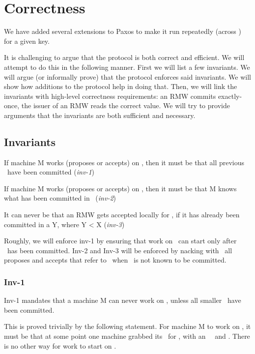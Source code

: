 \section{Correctness}\label{sec:cor}
We have added several extensions to Paxos to make it run repeatedly (\ie across \lognos) for a given key.

It is challenging to argue that the protocol is both  correct and  efficient.
We will attempt to do this in the following manner. 
First we will list a few invariants. We will argue (or informally prove) that the protocol  enforces said invariants. We will show how additions to the protocol help in doing that.
Then, we will link the invariants with high-level correctness requirements: an RMW commits exactly-once, the issuer of an RMW reads the correct value. We will try to provide arguments that the invariants are both sufficient and necessary.

\subsection{Invariants} \label{sec:cor:invs}

\squishlist
\item If machine M works (proposes or accepts) on \lognox, then it must be that all previous \lognos~have been committed (\emph{inv-1})
\item If machine M works (proposes or accepts) on \lognox, then it must be that M knows what has been committed in \lognoxmin~(\emph{inv-2})
\item It can never be that an RMW gets accepted locally for \lognox, if it has already been committed in a \lognoeq Y, where Y < X (\emph{inv-3})
\squishend

Roughly, we will enforce inv-1 by ensuring that work on \lognox~can start only after \lognoxmin~has been committed.
Inv-2 and Inv-3 will be enforced by nacking with \loghigh~all proposes and accepts that refer to \lognox~when \lognoxmin~is not known to be committed.

\subsubsection{Inv-1}
Inv-1 mandates that a machine M can never work on \lognox, unless all smaller \lognos~have been committed. 

This is proved trivially by the following statement. For machine M to work on \lognox, it must be that at some point one machine grabbed its \kv~for \lognox, with an \invalid~\kv~and \comlognoxmin. There is no other way for work to start on \lognox. 

